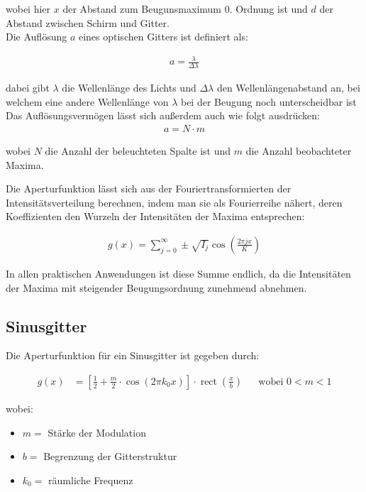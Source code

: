 \documentclass[12pt]{article}
\DeclareMathOperator{\rect}{\mathrm{rect}}
\begin{document}
wobei hier $x$ der Abstand zum Beugunsmaximum 0. Ordnung ist und $d$ der Abstand zwischen Schirm und Gitter.\\

Die Auflösung $a$ eines optischen Gitters ist definiert als:  \label{aufloesung}

\begin{align}
a = \frac{\lambda}{\Delta \lambda}
\end{align}

dabei gibt $\lambda$ die Wellenlänge des Lichts und $\Delta \lambda$ den Wellenlängenabstand an, bei welchem eine andere Wellenlänge von $\lambda$ bei der Beugung noch unterscheidbar ist \cite{Anleitung}
Das Auflösungsvermögen lässt sich außerdem auch wie folgt ausdrücken:
\begin{align}
a = N \cdot m 
\end{align}

wobei $N$ die Anzahl der beleuchteten Spalte ist und $m$ die Anzahl beobachteter Maxima.

Die Aperturfunktion lässt sich aus der Fouriertransformierten der Intensitätsverteilung berechnen, indem man sie als Fourierreihe nähert, deren Koeffizienten den Wurzeln der Intensitäten der Maxima entsprechen:

\begin{align}
g(x) = \sum_{j = 0}^{\infty} \pm \sqrt{I_j}\cos\left( \frac{2 \pi j x}{K}\right) \label{Fourier1}
\end{align} 

In allen praktischen Anwendungen ist diese Summe endlich, da die Intensitäten der Maxima mit steigender Beugungsordnung zunehmend abnehmen. 

\subsection{Sinusgitter}

Die Aperturfunktion für ein Sinusgitter ist gegeben durch:

\begin{align}
g\left( x\right) &= \left[ \frac{1}{2} + \frac{m}{2} \cdot \cos\left( 2 \pi k_0 x \right)   \right] \cdot \rect \left( \frac{x}{b} \right)  &&\text{wobei } 0 < m < 1
\end{align}

wobei: 

\begin{itemize}
\item $m =$ Stärke der Modulation
\item $b =$ Begrenzung der Gitterstruktur
\item $k_0 = $ räumliche Frequenz
\end{itemize}
\end{document}
